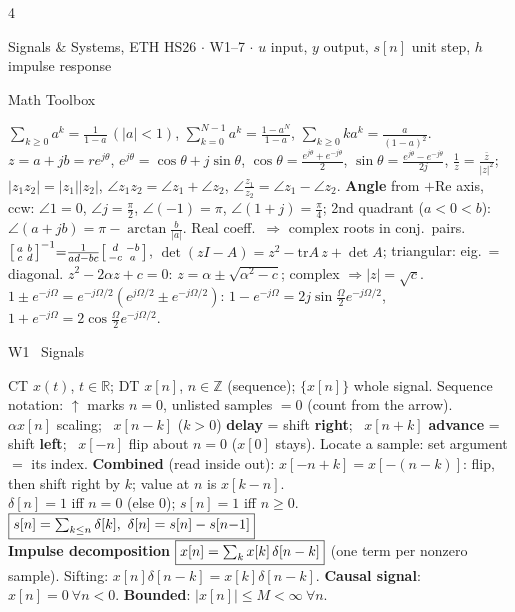 \documentclass[a4paper,landscape]{article}
\newcommand{\sect}[1]{\par\vspace{1pt}\noindent\colorbox{secblue}{\parbox{\dimexpr\linewidth-2\fboxsep}{\color{white}\bfseries\fontsize{6.8}{7.6}\selectfont\strut #1}}\par\vspace{0.4pt}}
\newcommand{\bx}[1]{\fbox{$\textstyle #1$}}
\begin{document}
\fontsize{6.5}{7.3}\selectfont\raggedright
\setlength{\abovedisplayskip}{0.6pt}\setlength{\belowdisplayskip}{0.6pt}
\setlength{\abovedisplayshortskip}{0.3pt}\setlength{\belowdisplayshortskip}{0.3pt}
\setlength{\jot}{0.2pt}
\begin{multicols*}{4}
{\fontsize{5.2}{5.8}\selectfont Signals \& Systems, ETH HS26 $\cdot$ W1--7 $\cdot$ $u$ input, $y$ output, $s[n]$ unit step, $h$ impulse response\par}

\sect{Math Toolbox}
$\sum_{k\ge0}a^k=\frac1{1-a}\,(|a|{<}1)$, $\sum_{k=0}^{N-1}a^k=\frac{1-a^N}{1-a}$, $\sum_{k\ge0}ka^k=\frac{a}{(1-a)^2}$.
$z=a{+}jb=re^{j\theta}$, $e^{j\theta}=\cos\theta+j\sin\theta$, $\cos\theta=\frac{e^{j\theta}+e^{-j\theta}}2$, $\sin\theta=\frac{e^{j\theta}-e^{-j\theta}}{2j}$, $\frac1z=\frac{\bar z}{|z|^2}$; $|z_1z_2|=|z_1||z_2|$, $\angle z_1z_2=\angle z_1{+}\angle z_2$, $\angle\frac{z_1}{z_2}=\angle z_1{-}\angle z_2$.
\textbf{Angle} from $+$Re axis, ccw: $\angle1{=}0$, $\angle j{=}\frac\pi2$, $\angle({-}1){=}\pi$, $\angle(1{+}j){=}\frac\pi4$; 2nd quadrant ($a{<}0{<}b$): $\angle(a{+}jb)=\pi-\arctan\frac{b}{|a|}$. Real coeff.\ $\Rightarrow$ complex roots in conj.\ pairs.
$\begin{bsmallmatrix}a&b\\c&d\end{bsmallmatrix}^{-1}{=}\frac{1}{ad-bc}\begin{bsmallmatrix}d&-b\\-c&a\end{bsmallmatrix}$, $\det(zI{-}A)=z^2-\mathrm{tr}A\,z+\det A$; triangular: eig.\ = diagonal.
$z^2-2\alpha z+c=0$: $z=\alpha\pm\sqrt{\alpha^2-c}$; complex $\Rightarrow|z|=\sqrt c$.
$1\pm e^{-j\Omega}=e^{-j\Omega/2}(e^{j\Omega/2}\pm e^{-j\Omega/2})$: $1{-}e^{-j\Omega}=2j\sin\frac\Omega2e^{-j\Omega/2}$, $1{+}e^{-j\Omega}=2\cos\frac\Omega2e^{-j\Omega/2}$.

\sect{W1 \ Signals}
CT $x(t)$, $t\in\mathbb R$; DT $x[n]$, $n\in\mathbb Z$ (sequence); $\{x[n]\}$ whole signal. Sequence notation: $\uparrow$ marks $n{=}0$, unlisted samples $=0$ (count from the arrow).\\
$\alpha x[n]$ scaling; \ $x[n{-}k]$ ($k{>}0$) \textbf{delay} = shift \textbf{right}; \ $x[n{+}k]$ \textbf{advance} = shift \textbf{left}; \ $x[-n]$ flip about $n{=}0$ ($x[0]$ stays). Locate a sample: set argument $=$ its index.
\textbf{Combined} (read inside out): $x[-n{+}k]=x[-(n{-}k)]$: flip, then shift right by $k$; value at $n$ is $x[k-n]$.\\
$\delta[n]{=}1$ iff $n{=}0$ (else 0); $s[n]{=}1$ iff $n\ge0$. \ $\bx{s[n]=\sum_{k\le n}\delta[k],\ \delta[n]=s[n]-s[n{-}1]}$\\
\textbf{Impulse decomposition} $\bx{x[n]=\sum_kx[k]\,\delta[n-k]}$ (one term per nonzero sample). Sifting: $x[n]\delta[n{-}k]=x[k]\delta[n{-}k]$.
\textbf{Causal signal}: $x[n]{=}0\ \forall n{<}0$. \textbf{Bounded}: $|x[n]|\le M<\infty\ \forall n$.


\end{multicols*}
\end{document}
